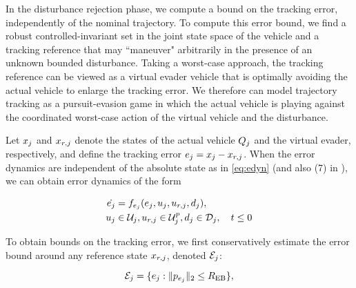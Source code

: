 In the disturbance rejection phase, we compute a bound on the tracking error, independently of the nominal trajectory. To compute this error bound, we find a robust controlled-invariant set in the joint state space of the vehicle and a tracking reference that may ``maneuver" arbitrarily in the presence of an unknown bounded disturbance. Taking a worst-case approach, the tracking reference can be viewed as a virtual evader vehicle that is optimally avoiding the actual vehicle to enlarge the tracking error. We therefore can model trajectory tracking as a pursuit-evasion game in which the actual vehicle is playing against the coordinated worst-case action of the virtual vehicle and the disturbance. %


Let $x_j$ and $x_{r,j}$ denote the states of the actual vehicle $Q_j$ and the virtual evader, respectively, and define the tracking error $e_j=x_j-x_{r,j}$. When the error dynamics are independent of the absolute state as in \eqref{eq:edyn} (and also (7) in \cite{Mitchell05}), we can obtain error dynamics of the form

\begin{equation}
\label{eq:edyn} %
\begin{aligned}
\dot{e_j} &= \fdyn_{e_j}(e_j, \ctrl_j, \ctrl_{r,j},\dstb_j), \\
\ctrl_j &\in \cset_j, \ctrl_{r,j} \in \cset^p_j, \dstb_j \in \dset_j, \quad t \leq 0
\end{aligned}
\end{equation}

To obtain bounds on the tracking error, we first conservatively estimate the error bound around any reference state $x_{r,j}$, denoted $\mathcal{E}_j$:

\begin{equation} \label{eqn:err}
\mathcal{E}_j = \{e_j: \|p_{e_j}\|_2 \le R_{\text{EB}} \}, 
\end{equation}

